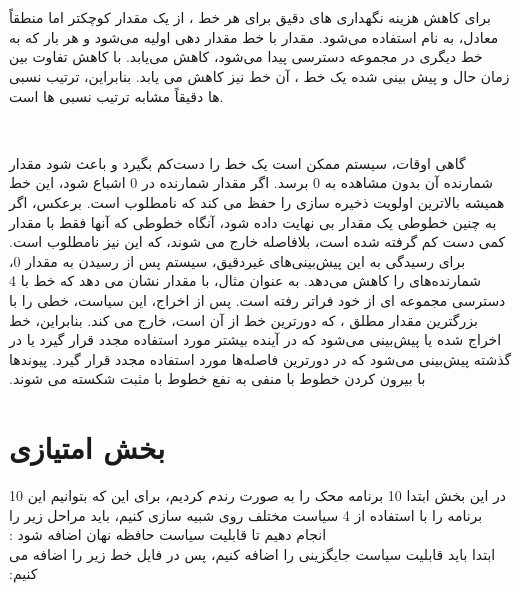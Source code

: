 ‫\begin{description}
‫\item[\lr{Estimated Time Remaining (ETR)}] \end{description} برای کاهش هزینه نگهداری  های دقیق  برای هر خط ، از یک مقدار کوچکتر اما منطقاً معادل، به نام   استفاده می‌شود. مقدار  با  خط مقدار دهی اولیه می‌شود و هر بار که به خط دیگری در مجموعه دسترسی پیدا می‌شود، کاهش می‌یابد. با کاهش تفاوت بین زمان حال و  پیش بینی شده یک خط ،   آن خط نیز کاهش می یابد. بنابراین، ترتیب نسبی  ها دقیقاً مشابه ترتیب نسبی  ها است.\\\begin{description}
‫\item[\lr{Handling Imprecise Predictions}] \end{description}
‫ گاهی اوقات، سیستم ممکن است  یک خط را دست‌کم بگیرد و باعث شود مقدار شمارنده  آن بدون مشاهده  به 0 برسد. اگر مقدار شمارنده در 0 اشباع شود، این خط همیشه بالاترین اولویت ذخیره سازی را حفظ می کند که نامطلوب است. برعکس، اگر به چنین خطوطی یک مقدار  بی نهایت داده شود، آنگاه خطوطی که  آنها فقط با مقدار کمی دست کم گرفته شده است، بلافاصله خارج می شوند، که این نیز نامطلوب است. برای رسیدگی به این پیش‌بینی‌های غیردقیق، سیستم پس از رسیدن به مقدار 0، شمارنده‌های  را کاهش می‌دهد. به عنوان مثال،   با مقدار   نشان می دهد که خط با 4 دسترسی مجموعه ای از  خود فراتر رفته است. پس از اخراج، این سیاست، خطی را با بزرگترین مقدار مطلق ، که دورترین خط از  آن است، خارج می کند. بنابراین، خط اخراج شده یا پیش‌بینی می‌شود که در آینده بیشتر مورد استفاده مجدد قرار گیرد یا در گذشته پیش‌بینی می‌شود که در دورترین فاصله‌ها مورد استفاده مجدد قرار گیرد. پیوندها با بیرون کردن خطوط با   منفی به نفع خطوط با  مثبت شکسته می شوند.
‫\newpage
‫\section*{بخش امتیازی}
‫در این بخش ابتدا 10 برنامه محک را به صورت رندم  کردیم، برای این که بتوانیم این 10 برنامه را با استفاده از 4 سیاست مختلف روی  شبیه سازی کنیم، باید مراحل زیر را انجام دهیم تا قابلیت سیاست حافظه نهان اضافه شود :\\
‫ابتدا باید قابلیت سیاست جایگزینی را اضافه کنیم، پس در فایل  خط زیر را اضافه می کنیم:\\
‫
